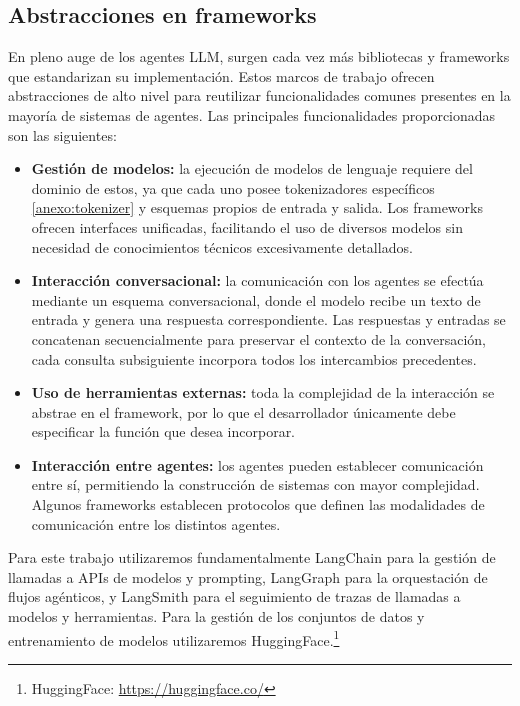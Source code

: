 


\subsection{Abstracciones en frameworks}
\label{sec:abst}
En pleno auge de los agentes LLM, surgen cada vez más bibliotecas y frameworks que estandarizan su implementación. Estos marcos de trabajo ofrecen abstracciones de alto nivel para reutilizar funcionalidades comunes presentes en la mayoría de sistemas de agentes.
Las principales funcionalidades proporcionadas son las siguientes: 
\begin{itemize}
\item {\textbf{Gestión de modelos:}} la ejecución de modelos de lenguaje requiere del dominio de estos, ya que cada uno posee tokenizadores específicos \ref{anexo:tokenizer} y esquemas propios de entrada y salida. Los frameworks ofrecen interfaces unificadas, facilitando el uso de diversos modelos sin necesidad de conocimientos técnicos excesivamente detallados.
\item {\textbf{Interacción conversacional:}} la comunicación con los agentes se efectúa mediante un esquema conversacional, donde el modelo recibe un texto de entrada y genera una respuesta correspondiente. Las respuestas y entradas se concatenan secuencialmente para preservar el contexto de la conversación, cada consulta subsiguiente incorpora todos los intercambios precedentes.
\item {\textbf{Uso de herramientas externas:}} toda la complejidad de la interacción se abstrae en el framework, por lo que el desarrollador únicamente debe especificar la función que desea incorporar.
\item {\textbf{Interacción entre agentes:}} los agentes pueden establecer comunicación entre sí, permitiendo la construcción de sistemas con mayor complejidad. Algunos frameworks establecen protocolos que definen las modalidades de comunicación entre los distintos agentes.
\end{itemize}

Para este trabajo utilizaremos fundamentalmente LangChain para la gestión de llamadas a APIs de modelos y prompting, LangGraph para la orquestación de flujos agénticos, y LangSmith para el seguimiento de trazas de llamadas a modelos y herramientas. Para la gestión de los conjuntos de datos y entrenamiento de modelos utilizaremos HuggingFace.\footnote{HuggingFace: \url{https://huggingface.co/}} 

